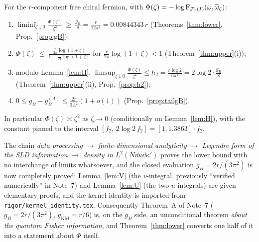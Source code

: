 \documentclass[11pt]{article}
\theoremstyle{definition}\newtheorem{problem}[theorem]{Problem}
\begin{document}
\begin{theorem}\label{thm:summary}
For the \(r\)-component free chiral fermion, with \(\Phi(\zeta)=-\log\operatorname{F}_{\mathcal F_r(I)}(\omega,\widetilde\omega_\zeta)\):
\begin{enumerate}[label=(\alph*),leftmargin=2em]
\item \(\displaystyle\liminf_{\zeta\downarrow0}\frac{\Phi(\zeta)}{\zeta^2}\ \ge\ \frac{g_B}{8}
 =\frac{r}{12\pi^2}=0.00844343\,r\) \hfill(Theorems~\ref{thm:lower}, Prop.~\ref{prop:gB});
\item \(\displaystyle\Phi(\zeta)\ \le\ \frac{\frac r{2\pi}\log(1+\zeta)}{1-\frac r{2\pi}\log(1+\zeta)}\)
 for \(\frac r{2\pi}\log(1+\zeta)<1\) \hfill(Theorem~\ref{thm:upper}(i));
\item modulo Lemma~\ref{lem:H}, \(\displaystyle\limsup_{\zeta\downarrow0}\frac{\Phi(\zeta)}{\zeta^2}
 \le h_2=\frac{r\log2}{6\pi^2}=2\log2\cdot\frac{g_B}{8}\) \hfill(Theorem~\ref{thm:upper}(ii),
 Prop.~\ref{prop:h2});
\item \(0\le g_B-g_B^{(\Lambda)}\le\frac{2r}{3\Lambda^2}(1+o(1))\) \hfill(Prop.~\ref{prop:tailgB}).
\end{enumerate}
In particular \(\Phi(\zeta)\asymp\zeta^2\) as \(\zeta\to0\) (conditionally on Lemma~\ref{lem:H}), with
the constant pinned to the interval \([f_2,\,2\log2\,f_2]=[1,1.3863]\cdot f_2\).
\end{theorem}

\begin{verdictok}
The chain
\emph{data processing} \(\to\) \emph{finite-dimensional analyticity} \(\to\) \emph{Legendre form of
the SLD information} \(\to\) \emph{density in \(L^2(N\dd\kappa\dd\kappa')\)}
proves the lower bound with no interchange of limits whatsoever, and the closed evaluation
\(g_B=2r/(3\pi^2)\) is now completely proved: Lemma~\ref{lem:V} (the \(v\)-integral, previously
``verified numerically'' in Note~7) and Lemma~\ref{lem:U} (the two \(u\)-integrals) are given
elementary proofs, and the kernel identity is imported from \texttt{rigor/kernel\_identity.tex}.
Consequently Theorem~A of Note~7 (\(g_B=2r/(3\pi^2)\), \(g_{\mathrm{KM}}=r/6\)) is, on the
\(g_B\) side, an unconditional theorem \emph{about the quantum Fisher information}, and
Theorem~\ref{thm:lower} converts one half of it into a statement about \(\Phi\) itself.
\end{verdictok}
\end{document}
